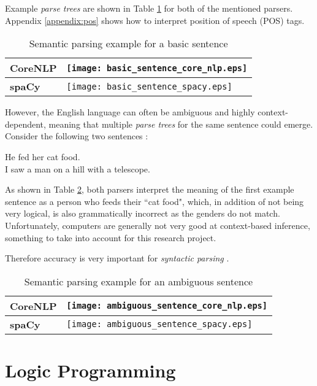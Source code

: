 Example \textit{parse trees} are shown in Table \ref{table:basic_sentence} for both of the mentioned parsers. Appendix \ref{appendix:pos} shows how to interpret position of speech (POS) tags.

\begin{table}[H]
\centering
\begin{tabular}{@{}ll@{}}
\toprule
\textbf{CoreNLP} & \texttt{[image: basic\_sentence\_core\_nlp.eps]} \\ \midrule
\textbf{spaCy} & \texttt{[image: basic\_sentence\_spacy.eps]}  \\ \bottomrule
\end{tabular}
\caption{Semantic parsing example for a basic sentence}
\label{table:basic_sentence}
\end{table}

However, the English language can often be ambiguous and highly context-dependent, meaning that multiple \textit{parse trees} for the same sentence could emerge. Consider the following two sentences \cite{noauthor_studying_nodate}:
\begin{displayquote}
He fed her cat food. \\
I saw a man on a hill with a telescope.
\end{displayquote}
As shown in Table \ref{table:ambiguous_sentence}, both parsers interpret the meaning of the first example sentence as a person who feeds their ``cat food", which, in addition of not being very logical, is also grammatically incorrect as the genders do not match. Unfortunately, computers are generally not very good at context-based inference, something to take into account for this research project.

Therefore accuracy is very important for \textit{syntactic parsing} \cite{gomez-rodriguez_how_2019}.

\begin{table}[H]
\centering
\begin{tabular}{@{}ll@{}}
\toprule
\textbf{CoreNLP} & \texttt{[image: ambiguous\_sentence\_core\_nlp.eps]} \\ \midrule
\textbf{spaCy} & \texttt{[image: ambiguous\_sentence\_spacy.eps]}  \\ \bottomrule
\end{tabular}
\caption{Semantic parsing example for an ambiguous sentence}
\label{table:ambiguous_sentence}
\end{table}

\section{Logic Programming}


